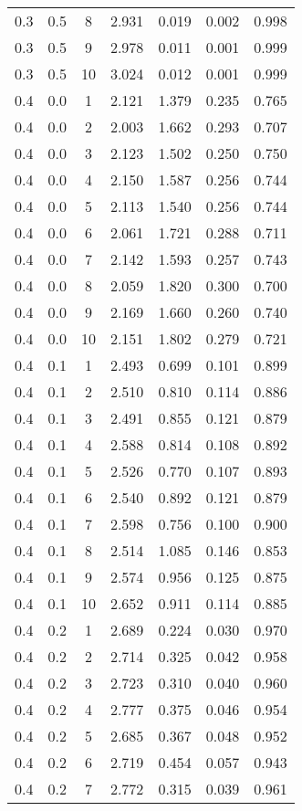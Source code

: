 \begin{tabular}{|c|c|c|c|c|c|c|}
0.3 & 0.5 & 8 & 2.931 & 0.019 & 0.002 & 0.998 \\
0.3 & 0.5 & 9 & 2.978 & 0.011 & 0.001 & 0.999 \\
0.3 & 0.5 & 10 & 3.024 & 0.012 & 0.001 & 0.999 \\
0.4 & 0.0 & 1 & 2.121 & 1.379 & 0.235 & 0.765 \\
0.4 & 0.0 & 2 & 2.003 & 1.662 & 0.293 & 0.707 \\
0.4 & 0.0 & 3 & 2.123 & 1.502 & 0.250 & 0.750 \\
0.4 & 0.0 & 4 & 2.150 & 1.587 & 0.256 & 0.744 \\
0.4 & 0.0 & 5 & 2.113 & 1.540 & 0.256 & 0.744 \\
0.4 & 0.0 & 6 & 2.061 & 1.721 & 0.288 & 0.711 \\
0.4 & 0.0 & 7 & 2.142 & 1.593 & 0.257 & 0.743 \\
0.4 & 0.0 & 8 & 2.059 & 1.820 & 0.300 & 0.700 \\
0.4 & 0.0 & 9 & 2.169 & 1.660 & 0.260 & 0.740 \\
0.4 & 0.0 & 10 & 2.151 & 1.802 & 0.279 & 0.721 \\
0.4 & 0.1 & 1 & 2.493 & 0.699 & 0.101 & 0.899 \\
0.4 & 0.1 & 2 & 2.510 & 0.810 & 0.114 & 0.886 \\
0.4 & 0.1 & 3 & 2.491 & 0.855 & 0.121 & 0.879 \\
0.4 & 0.1 & 4 & 2.588 & 0.814 & 0.108 & 0.892 \\
0.4 & 0.1 & 5 & 2.526 & 0.770 & 0.107 & 0.893 \\
0.4 & 0.1 & 6 & 2.540 & 0.892 & 0.121 & 0.879 \\
0.4 & 0.1 & 7 & 2.598 & 0.756 & 0.100 & 0.900 \\
0.4 & 0.1 & 8 & 2.514 & 1.085 & 0.146 & 0.853 \\
0.4 & 0.1 & 9 & 2.574 & 0.956 & 0.125 & 0.875 \\
0.4 & 0.1 & 10 & 2.652 & 0.911 & 0.114 & 0.885 \\
0.4 & 0.2 & 1 & 2.689 & 0.224 & 0.030 & 0.970 \\
0.4 & 0.2 & 2 & 2.714 & 0.325 & 0.042 & 0.958 \\
0.4 & 0.2 & 3 & 2.723 & 0.310 & 0.040 & 0.960 \\
0.4 & 0.2 & 4 & 2.777 & 0.375 & 0.046 & 0.954 \\
0.4 & 0.2 & 5 & 2.685 & 0.367 & 0.048 & 0.952 \\
0.4 & 0.2 & 6 & 2.719 & 0.454 & 0.057 & 0.943 \\
0.4 & 0.2 & 7 & 2.772 & 0.315 & 0.039 & 0.961 \\

\end{tabular}
